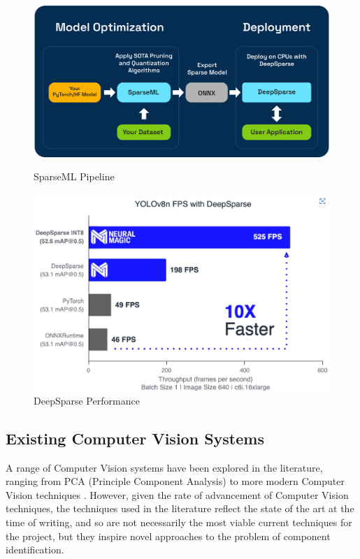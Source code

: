 \begin{figure}[t]
  \begin{minipage}[t]{0.45\textwidth}
    \centering
    \includegraphics[width=\textwidth]{imgs/articles/sparseml-workflow.png}
    \caption{SparseML Pipeline \cite{sparseml}}
  \end{minipage}
  \hfill
  \begin{minipage}[t]{0.45\textwidth}
      \centering
      \includegraphics[width=\textwidth]{imgs/articles/yoloperf.jpg}
      \caption{DeepSparse Performance \cite{neuralmagic}}
      \end{minipage}
\end{figure}
\subsection{Existing Computer Vision Systems}
A range of Computer Vision systems have been explored in the literature, ranging from PCA (Principle Component Analysis) \citet{Dhenge2013MechanicalNS} to more modern Computer Vision techniques \citet{Xu2020,s22239079}. However, given the rate of advancement of Computer Vision
techniques, the techniques used in the literature reflect the state of the art at the time of writing, and so are not necessarily the most viable current techniques for the project, but they inspire novel approaches to the problem of component identification.

